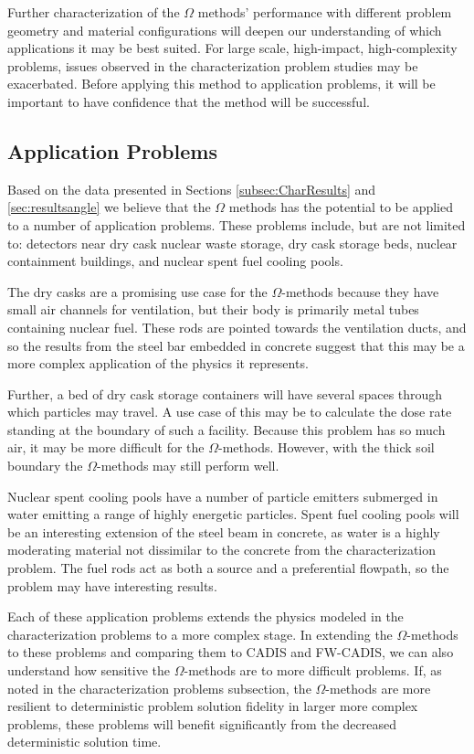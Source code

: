 Further characterization of the $\Omega$ methods' performance with different
problem geometry and material configurations will deepen our understanding of
which applications it may be best suited. For large scale, high-impact,
high-complexity problems, issues observed in the characterization problem
studies may be exacerbated. Before applying this method to application problems,
it will be important to have confidence that the method will be successful.

\subsection{Application Problems}
\label{subsec:appprobs}

Based on the data presented in Sections \ref{subsec:CharResults} and
\ref{sec:resultsangle} we believe that the
$\Omega$ methods has the potential to be applied to a number of application problems.
These
problems include, but are not limited to: detectors near dry cask nuclear waste
storage, dry cask storage beds, nuclear containment buildings, and nuclear spent fuel
cooling pools.

The dry casks are a promising use case for the $\Omega$-methods because
they have small air
channels for ventilation, but their body is primarily metal tubes containing
nuclear fuel. These rods are pointed towards the ventilation ducts, and so the
results from the steel bar embedded in concrete suggest that this may be a more
complex application of the physics it represents.

Further, a bed of dry cask storage containers will have several spaces through
which particles may travel. A use case of this may be to calculate the dose rate
standing at the boundary of such a facility. Because this problem has so much
air, it may be more difficult for the $\Omega$-methods. However, with the thick
soil boundary the $\Omega$-methods may still perform well.

Nuclear spent cooling pools have a number of particle emitters submerged
in water emitting a range of highly energetic particles. Spent fuel cooling
pools will be an interesting extension of the steel beam in concrete, as water
is a highly moderating material not dissimilar to the concrete from the
characterization problem. The fuel rods act as both a source and a preferential
flowpath, so the problem may have interesting results.

Each of these application problems extends the physics modeled in the
characterization problems to a more complex stage. In extending the
$\Omega$-methods to these problems and comparing them to CADIS and FW-CADIS, we
can also understand how sensitive the $\Omega$-methods are to more difficult
problems. If, as noted in the characterization problems subsection, the
$\Omega$-methods are more resilient to deterministic problem solution fidelity
in larger more complex problems,
these problems will benefit significantly from the decreased deterministic
solution time.
